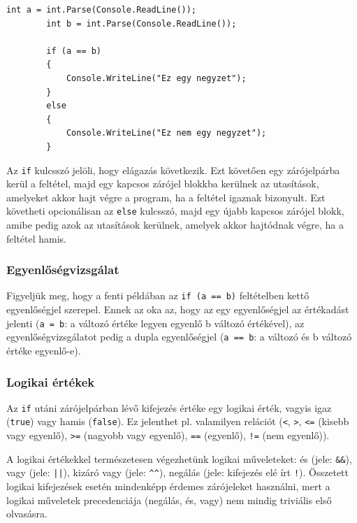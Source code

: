 \documentclass[a4paper]{article}
\begin{document}
	\begin{lstlisting}[caption=Elágazás, label=lst:if]
		int a = int.Parse(Console.ReadLine());
		int b = int.Parse(Console.ReadLine());
		
		if (a == b)
		{
			Console.WriteLine("Ez egy negyzet");
		}
		else
		{
			Console.WriteLine("Ez nem egy negyzet");
		}
	\end{lstlisting}
	
	Az \lstinline{if} kulcsszó jelöli, hogy elágazás következik. Ezt követően egy zárójelpárba kerül a feltétel, majd egy kapcsos zárójel blokkba kerülnek az utasítások, amelyeket akkor hajt végre a program, ha a feltétel igaznak bizonyult. Ezt követheti opcionálisan az \lstinline{else} kulcsszó, majd egy újabb kapcsos zárójel blokk, amibe pedig azok az utasítások kerülnek, amelyek akkor hajtódnak végre, ha a feltétel hamis.
	
	\subsubsection{Egyenlőségvizsgálat}
	Figyeljük meg, hogy a fenti példában az \lstinline{if (a == b)} feltételben kettő egyenlőségjel szerepel. Ennek az oka az, hogy az egy egyenlőségjel az értékadást jelenti (\lstinline{a = b}: a változó értéke legyen egyenlő b változó értékével), az egyenlőségvizsgálatot pedig a dupla egyenlőségjel (\lstinline{a == b}: a változó és b változó értéke egyenlő-e).
	
	\subsubsection{Logikai értékek}
	Az \lstinline{if} utáni zárójelpárban lévő kifejezés értéke egy logikai érték, vagyis igaz (\lstinline{true}) vagy hamis (\lstinline{false}). Ez jelenthet pl. valamilyen relációt (\lstinline{<}, \lstinline{>}, \lstinline{<=} (kisebb vagy egyenlő), \lstinline{>=} (nagyobb vagy egyenlő), \lstinline{==} (egyenlő), \lstinline{!=} (nem egyenlő)).
	
	A logikai értékekkel természetesen végezhetünk logikai műveleteket: és (jele: \lstinline{&&}), vagy (jele: \lstinline{||}), kizáró vagy (jele: \lstinline{^^}), negálás (jele: kifejezés elé írt \lstinline{!}). Összetett logikai kifejezések esetén mindenképp érdemes zárójeleket használni, mert a logikai műveletek precedenciája (negálás, és, vagy) nem mindig triviális első olvasásra.
	
\end{document}
